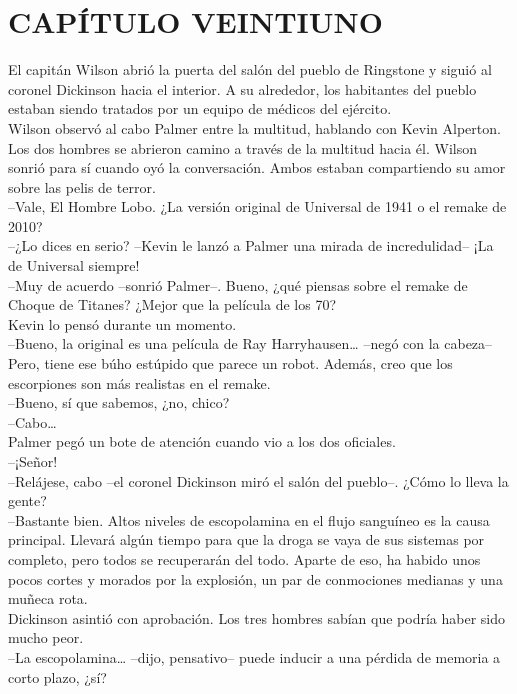 \chapter*{CAPÍTULO VEINTIUNO}
El capitán Wilson abrió la puerta del salón del pueblo de Ringstone y
siguió al coronel Dickinson hacia el interior. A su alrededor, los
habitantes del pueblo estaban siendo tratados por un equipo de médicos
del ejército.\\
Wilson observó al cabo Palmer entre la multitud, hablando con Kevin
Alperton. Los dos hombres se abrieron camino a través de la multitud
hacia él. Wilson sonrió para sí cuando oyó la conversación. Ambos
estaban compartiendo su amor sobre las pelis de terror.\\
--Vale, El Hombre Lobo. ¿La versión original de Universal de 1941 o el
remake de 2010?\\
--¿Lo dices en serio? --Kevin le lanzó a Palmer una mirada de
incredulidad-- ¡La de Universal siempre!\\
--Muy de acuerdo --sonrió Palmer--. Bueno, ¿qué piensas sobre el remake
de Choque de Titanes? ¿Mejor que la película de los 70?\\
Kevin lo pensó durante un momento.\\
--Bueno, la original es una película de Ray Harryhausen\ldots{} --negó
con la cabeza-- Pero, tiene ese búho estúpido que parece un robot.
Además, creo que los escorpiones son más realistas en el remake.\\
--Bueno, sí que sabemos, ¿no, chico?\\
--Cabo\ldots{}\\
Palmer pegó un bote de atención cuando vio a los dos oficiales.\\
--¡Señor!\\
--Relájese, cabo --el coronel Dickinson miró el salón del pueblo--.
¿Cómo lo lleva la gente?\\
--Bastante bien. Altos niveles de escopolamina en el flujo sanguíneo es
la causa principal. Llevará algún tiempo para que la droga se vaya de
sus sistemas por completo, pero todos se recuperarán del todo. Aparte de
eso, ha habido unos pocos cortes y morados por la explosión, un par de
conmociones medianas y una muñeca rota.\\
Dickinson asintió con aprobación. Los tres hombres sabían que podría
haber sido mucho peor.\\
--La escopolamina\ldots{} --dijo, pensativo-- puede inducir a una
pérdida de memoria a corto plazo, ¿sí?\\
